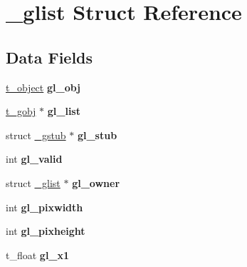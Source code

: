 \hypertarget{struct__glist}{\section{\-\_\-glist Struct Reference}
\label{struct__glist}
}
\subsection*{Data Fields}
\begin{DoxyCompactItemize}
\item 
\hypertarget{struct__glist_ad2be498e0f22fbd60cee7e4000e3338a}{\hyperlink{struct__text}{t\-\_\-object} {\bfseries gl\-\_\-obj}}\label{struct__glist_ad2be498e0f22fbd60cee7e4000e3338a}

\item 
\hypertarget{struct__glist_abe3f5a9b5d13e81a5dc474f65017adda}{\hyperlink{struct__gobj}{t\-\_\-gobj} $\ast$ {\bfseries gl\-\_\-list}}\label{struct__glist_abe3f5a9b5d13e81a5dc474f65017adda}

\item 
\hypertarget{struct__glist_ad2c0073ec9c8a16b46e2b075491cc533}{struct \hyperlink{struct__gstub}{\-\_\-gstub} $\ast$ {\bfseries gl\-\_\-stub}}\label{struct__glist_ad2c0073ec9c8a16b46e2b075491cc533}

\item 
\hypertarget{struct__glist_a310a8f64dcfcdf0c783705f105d9046c}{int {\bfseries gl\-\_\-valid}}\label{struct__glist_a310a8f64dcfcdf0c783705f105d9046c}

\item 
\hypertarget{struct__glist_a22cb36fb08ceec43517892fbabf62f76}{struct \hyperlink{struct__glist}{\-\_\-glist} $\ast$ {\bfseries gl\-\_\-owner}}\label{struct__glist_a22cb36fb08ceec43517892fbabf62f76}

\item 
\hypertarget{struct__glist_ac47671dfbc0f15a38224718fa6e5b3ac}{int {\bfseries gl\-\_\-pixwidth}}\label{struct__glist_ac47671dfbc0f15a38224718fa6e5b3ac}

\item 
\hypertarget{struct__glist_aa85a2753fca5660aaf6a25d0943e0a17}{int {\bfseries gl\-\_\-pixheight}}\label{struct__glist_aa85a2753fca5660aaf6a25d0943e0a17}

\item 
\hypertarget{struct__glist_aa240a0c75ded4a517c20f98e638c117c}{t\-\_\-float {\bfseries gl\-\_\-x1}}\label{struct__glist_aa240a0c75ded4a517c20f98e638c117c}


\end{DoxyCompactItemize}
